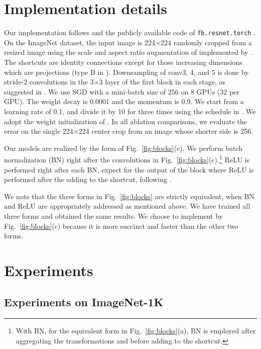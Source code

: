 \documentclass[10pt,twocolumn,letterpaper]{article}
\begin{document}
\section{Implementation details}
\label{sec:impl}

Our implementation follows \cite{He2016} and the publicly available code of \texttt{fb.resnet.torch} \cite{Gross2016}. On the ImageNet dataset, the input image is 224$\times$224 randomly cropped from a resized image using the scale and aspect ratio augmentation of \cite{Szegedy2015} implemented by \cite{Gross2016}. 
The shortcuts are identity connections except for those increasing dimensions which are projections (type B in \cite{He2016}).
Downsampling of conv3, 4, and 5 is done by stride-2 convolutions in the 3$\times$3 layer of the first block in each stage, as suggested in \cite{Gross2016}.
We use SGD with a mini-batch size of 256 on 8 GPUs (32 per GPU).
The weight decay is 0.0001 and the momentum is 0.9. We start from a learning rate of 0.1, and divide it by 10 for three times using the schedule in \cite{Gross2016}. We adopt the weight initialization of \cite{He2015}. In all ablation comparisons, we evaluate the error on the single 224$\times$224 center crop from an image whose shorter side is 256.

Our models are realized by the form of Fig.~\ref{fig:blocks}(c). 
We perform batch normalization (BN) \cite{Ioffe2015} right after the convolutions in Fig.~\ref{fig:blocks}(c).\footnote{With BN, for the equivalent form in Fig.~\ref{fig:blocks}(a), BN is employed after aggregating the transformations and before adding to the shortcut.} ReLU is performed right after each BN, expect for the output of the block where ReLU is performed after the adding to the shortcut, following \cite{He2016}.

We note that the three forms in Fig.~\ref{fig:blocks} are strictly equivalent, when BN and ReLU are appropriately addressed as mentioned above. We have trained all three forms and obtained the same results. We choose to implement by Fig.~\ref{fig:blocks}(c) because it is more succinct and faster than the other two forms.


\section{Experiments}

\subsection{Experiments on ImageNet-1K}
\end{document}
